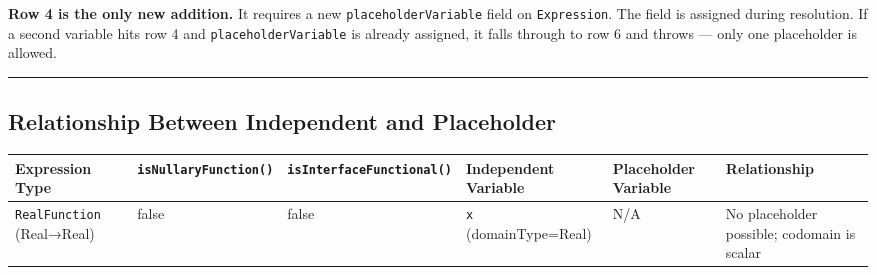 \documentclass[
]{article}
\begin{document}
\textbf{Row 4 is the only new addition.} It requires a new
\texttt{placeholderVariable} field on \texttt{Expression}. The field is
assigned during resolution. If a second variable hits row 4 and
\texttt{placeholderVariable} is already assigned, it falls through to
row 6 and throws --- only one placeholder is allowed.

\begin{center}\rule{0.5\linewidth}{0.5pt}\end{center}

\subsection{Relationship Between Independent and
Placeholder}\label{relationship-between-independent-and-placeholder}

\begin{longtable}[]{@{}
  >{\raggedright\arraybackslash}p{}
  >{\raggedright\arraybackslash}p{}
  >{\raggedright\arraybackslash}p{}
  >{\raggedright\arraybackslash}p{}
  >{\raggedright\arraybackslash}p{}
  >{\raggedright\arraybackslash}p{}@{}}
\toprule\noalign{}
\begin{minipage}[b]{\linewidth}\raggedright
Expression Type
\end{minipage} & \begin{minipage}[b]{\linewidth}\raggedright
\texttt{isNullaryFunction()}
\end{minipage} & \begin{minipage}[b]{\linewidth}\raggedright
\texttt{isInterfaceFunctional()}
\end{minipage} & \begin{minipage}[b]{\linewidth}\raggedright
Independent Variable
\end{minipage} & \begin{minipage}[b]{\linewidth}\raggedright
Placeholder Variable
\end{minipage} & \begin{minipage}[b]{\linewidth}\raggedright
Relationship
\end{minipage} \\
\midrule\noalign{}
\endhead
\bottomrule\noalign{}
\endlastfoot
\texttt{RealFunction} (Real→Real) & false & false & \texttt{x}
(domainType=Real) & N/A & No placeholder possible; codomain is scalar \\

\end{longtable}
\end{document}
